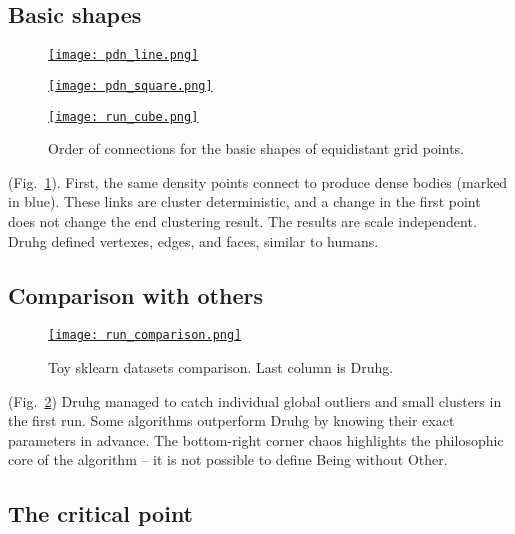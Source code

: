 \documentclass[12pt, a4paper, twocolumn]{article}
\newcommand{\githubPics}{https://raw.githubusercontent.com/artamono1/druhg/master/papers/druhg/}
\begin{document}
\subsection{Basic shapes}

\begin{figure}[!htb]
  \begin{minipage}[c]{0.20\linewidth}
    \href{\githubPics pdn_line.png}{\texttt{[image: pdn\_line.png]}}
  \end{minipage}\hfill
  \begin{minipage}[c]{0.40\linewidth}
    \href{\githubPics pdn_square.png}{\texttt{[image: pdn\_square.png]}}
  \end{minipage}\hfill
  \begin{minipage}[c]{0.40\linewidth}
    \href{\githubPics run_cube.png}{\texttt{[image: run\_cube.png]}}
  \end{minipage}
  \caption{Order of connections for the basic shapes of equidistant grid points.} \label{fig:Geoshapes}
\end{figure}

(Fig.~\ref{fig:Geoshapes}). First, the same density points connect to produce dense bodies (marked in blue). These links are cluster deterministic, and a change in the first point does not change the end clustering result. The results are scale independent.
Druhg defined vertexes, edges, and faces, similar to humans. 

\subsection{Comparison with others}
\begin{figure}[H]
  \centering
  \href{\githubPics run_comparison.png}{\texttt{[image: run\_comparison.png]}}
  \caption{Toy sklearn datasets comparison. Last column is Druhg.} \label{fig:SklearnDatasets}
\end{figure}

(Fig.~\ref{fig:SklearnDatasets}) Druhg managed to catch individual global outliers and small clusters in the first run. Some algorithms outperform Druhg by knowing their exact parameters in advance.
The bottom-right corner chaos highlights the philosophic core of the algorithm -- it is not possible to define Being without Other.


\subsection{The critical point}
\end{document}
